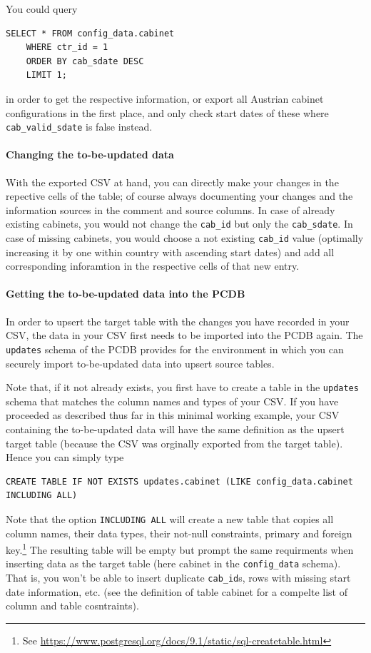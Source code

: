 You could query 
\begin{lstlisting}[language=postgreSQL]
SELECT * FROM config_data.cabinet 
	WHERE ctr_id = 1
	ORDER BY cab_sdate DESC
	LIMIT 1;
\end{lstlisting}
in order to get the respective information, or export all Austrian cabinet configurations in the first place, and only check start dates of these where  \texttt{cab\_valid\_sdate} is false instead.

\paragraph{Changing the to-be-updated data}
With the exported CSV at hand, you can directly make your changes in the repective cells of the table; of course always documenting your changes and the information sources in the comment and source columns.
In case of already existing cabinets, you would not change the \texttt{cab\_id} but only the \texttt{cab\_sdate}.
In case of missing cabinets, you would choose a not existing \texttt{cab\_id} value (optimally increasing it by one within country with ascending start dates) and add all corresponding inforamtion in the respective cells of that new entry.

\paragraph{Getting the to-be-updated data into the PCDB}
In order to upsert the target table with the changes you have recorded in your CSV, the data in your CSV first needs to be imported into the PCDB again.
The \texttt{updates} schema of the PCDB provides for the environment in which you can securely import to-be-updated data into upsert source tables.

Note that, if it not already exists, you first have to create a table in the \texttt{updates} schema that matches the column names and types of your CSV.
If you have proceeded as described thus far in this minimal working example, your CSV containing the to-be-updated data will have the same definition as the upsert target table (because the CSV was orginally exported from the target table).
Hence you can simply type 
\begin{lstlisting}[language=postgreSQL]
CREATE TABLE IF NOT EXISTS updates.cabinet (LIKE config_data.cabinet INCLUDING ALL)
\end{lstlisting}
Note that the option \texttt{INCLUDING ALL} will create a new table that copies all column names, their data types, their not-null constraints, primary and foreign key.\footnote{See \url{https://www.postgresql.org/docs/9.1/static/sql-createtable.html}}
The resulting table will be empty but prompt the same requirments when inserting data as the target table (here cabinet in the \texttt{config\_data} schema). 
That is, you won't be able to insert duplicate \texttt{cab\_id}s, rows with missing start date information, etc. (see the definition of table cabinet for a compelte list of column and table cosntraints).


